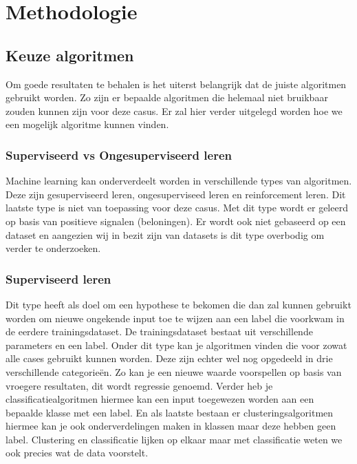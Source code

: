 
\chapter{Methodologie}
\label{ch:methodologie}



\section{Keuze algoritmen}
\label{sec:keuze-algoritmen}
Om goede resultaten te behalen is het uiterst belangrijk dat de juiste algoritmen gebruikt worden. Zo zijn er bepaalde algoritmen die helemaal niet bruikbaar zouden kunnen zijn voor deze casus. Er zal hier verder uitgelegd worden hoe we een mogelijk algoritme kunnen vinden.

\subsection{Superviseerd vs Ongesuperviseerd leren}
\label{sec: superviseerd-vs-ongesuperviseerd-leren}
Machine learning kan onderverdeelt worden in verschillende types van algoritmen. Deze zijn gesuperviseerd leren, ongesuperviseed leren en reinforcement leren. Dit laatste type is niet van toepassing voor deze casus. Met dit type wordt er geleerd op basis van positieve signalen (beloningen). Er wordt ook niet gebaseerd op een dataset en aangezien wij in bezit zijn van datasets is dit type overbodig om verder te onderzoeken. 

\subsection*{Superviseerd leren}
\label{sec: superviseerd-leren}
Dit type heeft als doel om een hypothese te bekomen die dan zal kunnen gebruikt worden om nieuwe ongekende input toe te wijzen aan een label die voorkwam in de eerdere trainingsdataset. De trainingsdataset bestaat uit verschillende parameters en een label. Onder dit type kan je algoritmen vinden die voor zowat alle cases gebruikt kunnen worden. Deze zijn echter wel nog opgedeeld in drie verschillende categorieën. Zo kan je een nieuwe waarde voorspellen op basis van vroegere resultaten, dit wordt regressie genoemd. Verder heb je classificatiealgoritmen hiermee kan een input toegewezen worden aan een bepaalde klasse met een label. En als laatste bestaan er clusteringsalgoritmen hiermee kan je ook onderverdelingen maken in klassen maar deze hebben geen label. Clustering en classificatie lijken op elkaar maar met classificatie weten we ook precies wat de data voorstelt. 

